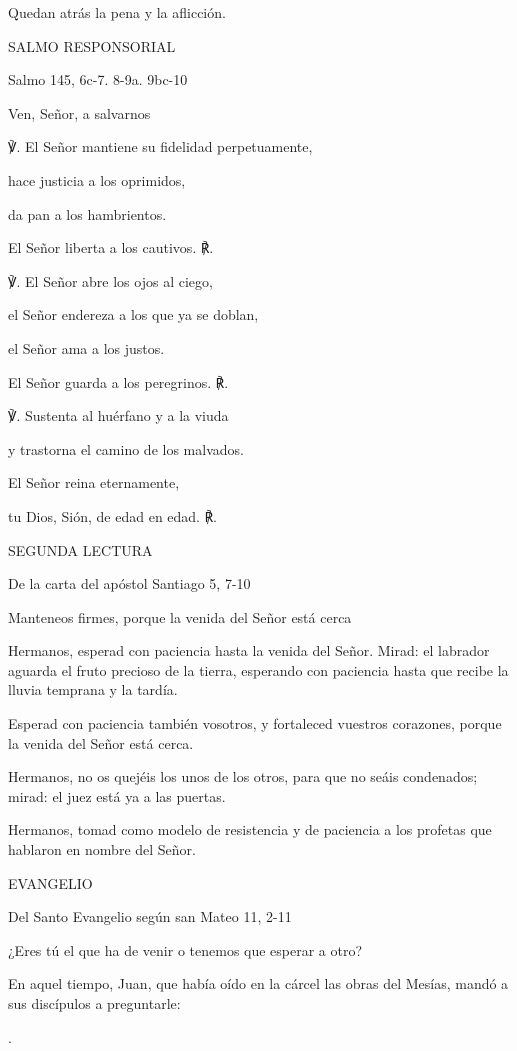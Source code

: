 \begin{body}
\begin{body}
Quedan atrás la pena y la aflicción.

SALMO RESPONSORIAL

Salmo 145, 6c-7. 8-9a. 9bc-10

Ven, Señor, a salvarnos

℣. El Señor mantiene su fidelidad perpetuamente,

hace justicia a los oprimidos,

da pan a los hambrientos.

El Señor liberta a los cautivos. ℟.

℣. El Señor abre los ojos al ciego,

el Señor endereza a los que ya se doblan,

el Señor ama a los justos.

El Señor guarda a los peregrinos. ℟.

℣. Sustenta al huérfano y a la viuda

y trastorna el camino de los malvados.

El Señor reina eternamente,

tu Dios, Sión, de edad en edad. ℟.

SEGUNDA LECTURA

De la carta del apóstol Santiago 5, 7-10

Manteneos firmes, porque la venida del Señor está cerca

Hermanos, esperad con paciencia hasta la venida del Señor. Mirad: el
labrador aguarda el fruto precioso de la tierra, esperando con paciencia
hasta que recibe la lluvia temprana y la tardía.

Esperad con paciencia también vosotros, y fortaleced vuestros corazones,
porque la venida del Señor está cerca.

Hermanos, no os quejéis los unos de los otros, para que no seáis
condenados; mirad: el juez está ya a las puertas.

Hermanos, tomad como modelo de resistencia y de paciencia a los profetas
que hablaron en nombre del Señor.

EVANGELIO

Del Santo Evangelio según san Mateo 11, 2-11

¿Eres tú el que ha de venir o tenemos que esperar a otro?

En aquel tiempo, Juan, que había oído en la cárcel las obras del Mesías,
mandó a sus discípulos a preguntarle:

.


\end{body}
\end{body}
